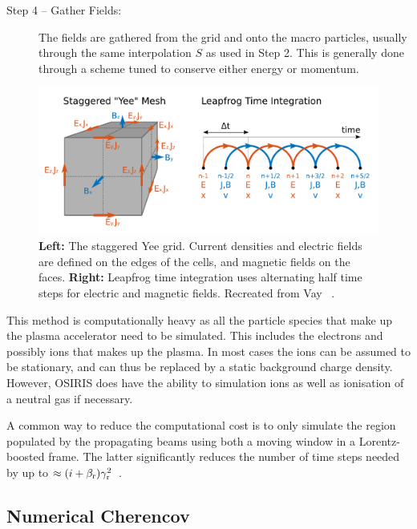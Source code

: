 \begin{description}
    \item[Step 4 -- Gather Fields:] The fields are gathered from the grid and onto the macro particles, usually through the same interpolation $S$ as used in Step 2.
    This is generally done through a scheme tuned to conserve either energy or momentum.
\end{description}

\begin{figure}[hbt]
    \centering
    \includegraphics[width=0.75\linewidth]{figures/EMFSolver}
    \caption{\label{Fig:PIC:EMF}
        \textbf{Left:} The staggered Yee grid. Current densities and electric fields are defined on the edges of the cells, and magnetic fields on the faces.
        \textbf{Right:} Leapfrog time integration uses alternating half time steps for electric and magnetic fields.
        Recreated from Vay \etal~\cite{vay:2016}.
    }
\end{figure}

This method is computationally heavy as all the particle species that make up the plasma accelerator need to be simulated.
This includes the electrons and possibly ions that makes up the plasma.
In most cases the ions can be assumed to be stationary, and can thus be replaced by a static background charge density.
However, OSIRIS does have the ability to simulation ions as well as ionisation of a neutral gas if necessary.

A common way to reduce the computational cost is to only simulate the region populated by the propagating beams using both a moving window in a Lorentz-boosted frame.
The latter significantly reduces the number of time steps needed by up to $\approx (i+\beta_{\mathrm{r}})\gamma_{\mathrm{r}}^2$~\cite{vay:2011}.

\subsection{Numerical Cherencov}
\label{PIC:NumCher}

